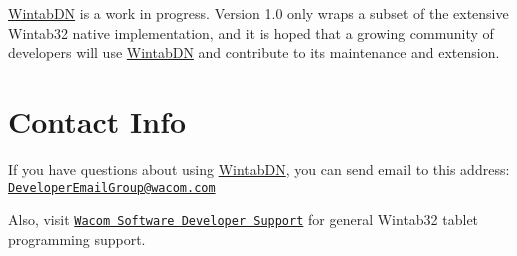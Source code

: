 \hyperlink{namespace_wintab_d_n}{WintabDN} is a work in progress. Version 1.0 only wraps a subset of the extensive Wintab32 native implementation, and it is hoped that a growing community of developers will use \hyperlink{namespace_wintab_d_n}{WintabDN} and contribute to its maintenance and extension.\hypertarget{index_contact_sec}{}\section{Contact Info}\label{index_contact_sec}
If you have questions about using \hyperlink{namespace_wintab_d_n}{WintabDN}, you can send email to this address: \href{mailto:DeveloperEmailGroup@wacom.com}{\tt DeveloperEmailGroup@wacom.com}

Also, visit \href{http://wacomeng.com/windows/index.html}{\tt Wacom Software Developer Support} for general Wintab32 tablet programming support. 